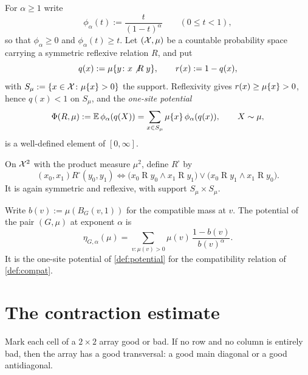 \begin{definition}
\label{def:potential}
\leanok
For $\alpha\geq1$ write
\[
 \phi_\alpha(t):=\frac{t}{(1-t)^\alpha}\qquad(0\leq t<1),
\]
so that $\phi_\alpha\geq0$ and $\phi_\alpha(t)\geq t$. Let $(\mathcal{X},\mu)$ be a countable
probability space carrying a symmetric reflexive relation $R$, and put
\[
 q(x):=\mu\{y\colon x\mathrel{\not R}y\},\qquad r(x):=1-q(x),
\]
with $S_\mu:=\{x\in\mathcal{X}\colon\mu\{x\}>0\}$ the support. Reflexivity gives $r(x)\geq
\mu\{x\}>0$, hence $q(x)<1$ on $S_\mu$, and the \emph{one-site potential}
\[
 \Phi(R,\mu):=\mathbb{E}\,\phi_\alpha(q(X))
 =\sum_{x\in S_\mu}\mu\{x\}\,\phi_\alpha(q(x)),\qquad X\sim\mu,
\]
is a well-defined element of $[0,\infty]$.
\end{definition}

\begin{definition}
\label{def:square}
\leanok
{}
On $\mathcal{X}^2$ with the product measure $\mu^2$, define $R^\square$ by
\[
 (x_0,x_1)\mathrel{R^\square}(y_0,y_1)
 \iff
 \bigl(x_0\mathrel{R}y_0\wedge x_1\mathrel{R}y_1\bigr)
 \vee
 \bigl(x_0\mathrel{R}y_1\wedge x_1\mathrel{R}y_0\bigr).
\]
It is again symmetric and reflexive, with support $S_\mu\times S_\mu$.
\end{definition}

\begin{definition}
\label{def:etaG}
\leanok
{}
Write $b(v):=\mu(B_G(v,1))$ for the compatible mass at $v$. The potential of the pair
$(G,\mu)$ at exponent $\alpha$ is
\[
 \eta_{G,\alpha}(\mu)=\sum_{v\colon\mu(v)>0}\mu(v)\,\frac{1-b(v)}{b(v)^{\alpha}} .
\]
It is the one-site potential of \cref{def:potential} for the compatibility relation of
\cref{def:compat}.
\end{definition}

\section{The contraction estimate}

\begin{lemma}
\label{thm:transversal}
\leanok
Mark each cell of a $2\times2$ array good or bad. If no row and no column is entirely bad,
then the array has a good transversal: a good main diagonal or a good antidiagonal.
\end{lemma}

